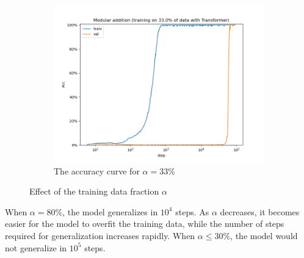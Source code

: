 \begin{figure}[!ht]
    \hfill %
    \begin{subfigure}[t]{0.3\textwidth}
        \includegraphics[width=\linewidth]{fig/grokking_curves/addition_33.0_Transformer_step.png}
        \caption{The accuracy curve for $\alpha = 33\%$}
        \label{fig:grokking_alpha_33}
    \end{subfigure}

    \caption{Effect of the training data fraction $\alpha$}
    \label{fig:effect_of_alpha}
\end{figure}

When $\alpha = 80\%$, the model generalizes in $10^4$ steps.
As $\alpha$ decreases, it becomes easier for the model to overfit the training data, while the number of steps required for generalization increases rapidly.
When $\alpha \leq 30\%$, the model would not generalize in $10^5$ steps.
